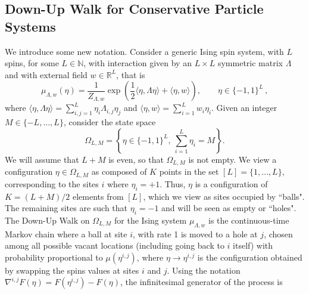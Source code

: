 \documentclass[11pt,reqno]{amsart}
\numberwithin{equation}{section}
\numberwithin{figure}{section}
\newcommand{\1}{\mathds{1}}
\let\O=\Omega
\let\L=\Lambda
\newcommand{\bbR}{{\ensuremath{\mathbb R}} }
\begin{document}
%
%
%

\subsection{Down-Up Walk for Conservative Particle Systems}
We introduce some new notation. Consider a generic Ising spin system, with $L$ spins, for some \(L \in \mathbb{N}\), with interaction given by an $L\times L$ symmetric matrix $\L$ and with external field $w\in\bbR^L$, that is
 \begin{equation}\label{L-Ising-Measure}
\mu_{\Lambda,w}(\eta) =\frac1{Z_{\L,w}} \exp\left( \frac{1}{2} \langle \eta, \Lambda \eta \rangle + \langle \eta, w \rangle \right),\qquad \eta\in\{-1,1\}^L\,,
\end{equation}
where $ \langle \eta, \Lambda \eta \rangle=\sum_{i,j=1}^L\eta_i\L_{i,j}\eta_j$ and $\langle \eta, w \rangle=\sum_{i=1}^Lw_i\eta_i$. Given an integer $M\in\{-L,\dots,L\}$, consider the state space
\begin{equation}\label{OLM}
\Omega_{L,M} = \left\{ \eta\in\{-1,1\}^L, \  \textstyle{\sum_{i=1}^L} \eta_i = M\right\}.
\end{equation}
We will assume that $L+M$ is even, so that $\O_{L,M}$ is not empty. 
We view a configuration $\eta\in\O_{L,M}$ as composed of $K$ points in the set $[L]=\{1,\dots,L\}$, corresponding to the sites $i$  where $\eta_i=+1$. Thus, $\eta$ is a configuration of $K=(L+M)/2$ elements from $[L]$, which we view as sites occupied by ``balls". The remaining sites are such that $\eta_i=-1$ and will be seen as empty or ``holes". The Down-Up Walk on $\Omega_{L,M}$  for the Ising system $\mu_{\Lambda,w}$ is the continuous-time Markov  chain where a ball at site $i$, with rate 1 is moved to a hole at $j$, chosen among all possible vacant locations (including going back to $i$ itself) with probability proportional to $\mu(\eta^{i,j})$, where \(\eta \to \eta^{i,j}\) is the configuration obtained by swapping the spins values at sites \(i\) and \(j\). Using the notation $\nabla^{i,j}F(\eta)=F(\eta^{i,j}) - F(\eta)$, the infinitesimal generator of the process is 
\end{document}
